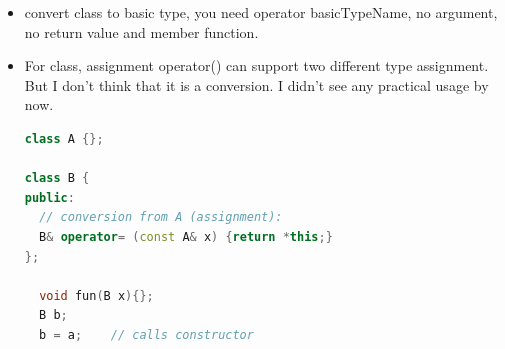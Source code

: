 \documentclass[a4paper,12pt,twoside]{book}
\begin{document}
\begin{itemize}
\item  convert class to basic type, you need operator basicTypeName, no argument, no return value and member function.


\item For class, assignment operator() can support two different type assignment. But I don't think that it is a conversion. I didn't see any practical usage by now. 
\begin{lstlisting}[frame=single, language=c++]
class A {};

class B {
public:
  // conversion from A (assignment):
  B& operator= (const A& x) {return *this;}
};

  void fun(B x){};
  B b;
  b = a;    // calls constructor
\end{lstlisting}

\end{itemize}
\end{document}
